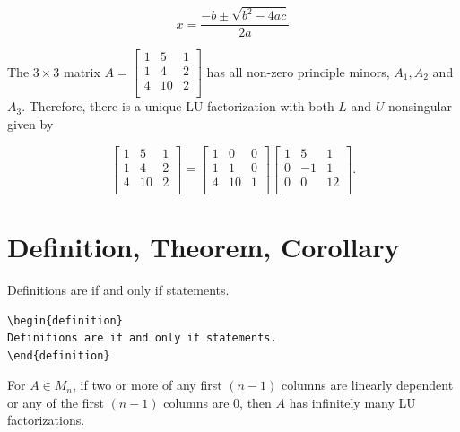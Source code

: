 \begin{equation}\label{eqn:quad}
x = \frac{-b \pm \sqrt{b^2 - 4ac}}{2a}
\end{equation}
  
\begin{example}\normalfont
The $3 \times 3$ matrix  
$A =  \begin{bmatrix}
1 & 5 & 1\\
1 & 4 & 2\\
4 & 10 & 2\\
\end{bmatrix}
$
has all non-zero principle minors, $A_1, A_2$ and $A_3$.  Therefore,  there is a unique LU factorization with both $L$ and $U$ nonsingular given by 
\end{example}
\[
\begin{bmatrix}
1 & 5 & 1\\
1 & 4 & 2\\
4 & 10 & 2\\
\end{bmatrix}
=
\begin{bmatrix}
1 & 0 & 0\\
1 & 1 & 0\\
4 & 10 & 1\\
\end{bmatrix}
\begin{bmatrix}
1 & 5 & 1\\
0 & -1 & 1\\
0 & 0 & 12\\
\end{bmatrix}.
\]



\section{Definition, Theorem, Corollary}


\begin{definition}
Definitions are if and only if statements.  
\end{definition}

\begin{verbatim}
\begin{definition}
Definitions are if and only if statements.  
\end{definition}
\end{verbatim}

\begin{theorem}
{For $A \in M_n$, if two or more of any first $(n-1)$ columns are linearly dependent or any of the first $(n-1)$ columns are 0, then $A$ has infinitely many LU factorizations.}
\end{theorem}

